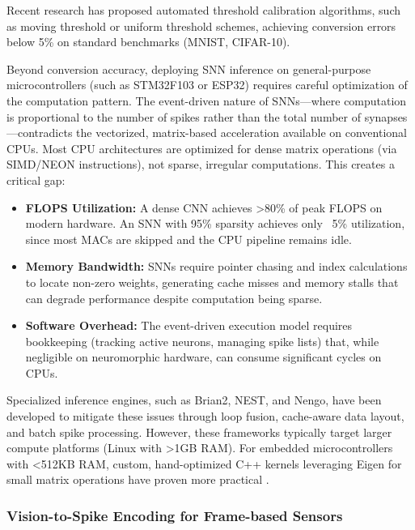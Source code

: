 Recent research \cite{rueckauer2017conversion, diehl2015fast} has proposed automated threshold calibration 
algorithms, such as moving threshold or uniform threshold schemes, achieving conversion errors below 5\% on 
standard benchmarks (MNIST, CIFAR-10).

Beyond conversion accuracy, deploying SNN inference on general-purpose microcontrollers (such as STM32F103 or ESP32) 
requires careful optimization of the computation pattern. The event-driven nature of SNNs—where computation is 
proportional to the number of spikes rather than the total number of synapses—contradicts the vectorized, 
matrix-based acceleration available on conventional CPUs. Most CPU architectures are optimized for dense matrix 
operations (via SIMD/NEON instructions), not sparse, irregular computations. This creates a critical gap:

\begin{itemize}
    \item \textbf{FLOPS Utilization:} A dense CNN achieves >80\% of peak FLOPS on modern hardware. An SNN with 95\% 
    sparsity achieves only ~5\% utilization, since most MACs are skipped and the CPU pipeline remains idle.
    
    \item \textbf{Memory Bandwidth:} SNNs require pointer chasing and index calculations to locate non-zero weights, 
    generating cache misses and memory stalls that can degrade performance despite computation being sparse.
    
    \item \textbf{Software Overhead:} The event-driven execution model requires bookkeeping (tracking active neurons, 
    managing spike lists) that, while negligible on neuromorphic hardware, can consume significant cycles on CPUs.
\end{itemize}

Specialized inference engines, such as Brian2, NEST, and Nengo, have been developed to mitigate these issues through 
loop fusion, cache-aware data layout, and batch spike processing. However, these frameworks typically target larger 
compute platforms (Linux with >1GB RAM). For embedded microcontrollers with <512KB RAM, custom, hand-optimized C++ 
kernels leveraging Eigen for small matrix operations have proven more practical \cite{pehle2022neuromorphic}.

\subsubsection{Vision-to-Spike Encoding for Frame-based Sensors}

